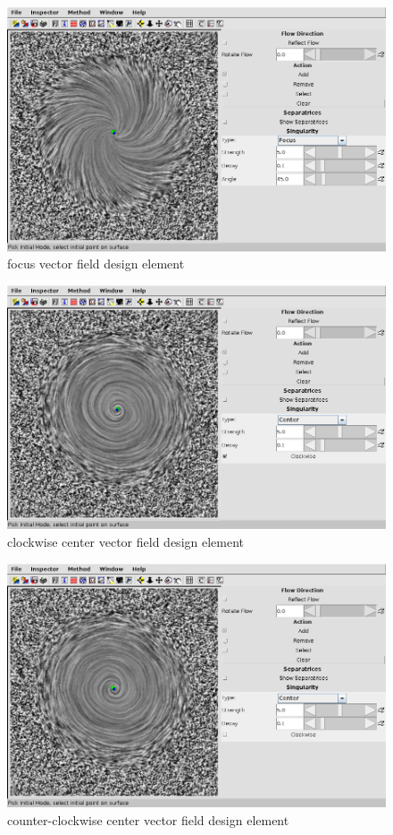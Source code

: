 \documentclass[a4paper,10pt,notitlepage]{scrreprt}
\begin{document}
\begin{figure}
  \centering
  \includegraphics[scale=0.5]{img-3-2/focus.png}
  \caption{focus vector field design element}
  \label{fig:focus}
\end{figure}

\begin{figure}
  \centering
  \includegraphics[scale=0.5]{img-3-2/center-cw.png}
  \caption{clockwise center vector field design element}
  \label{fig:center-cw}
\end{figure}

\begin{figure}
  \centering
  \includegraphics[scale=0.5]{img-3-2/center-cc.png}
  \caption{counter-clockwise center vector field design element}
  \label{fig:center-cc}
\end{figure}
\end{document}
